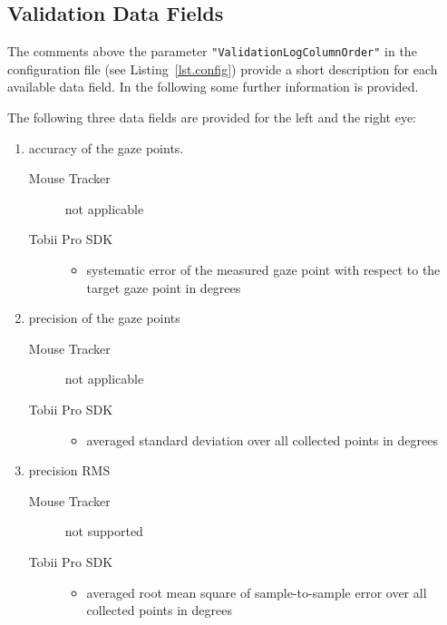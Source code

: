 \documentclass[a4paper,oneside]{book}
\begin{document}
\subsection{Validation Data Fields}
The comments above the parameter \texttt{"ValidationLogColumnOrder"} in the configuration file (see Listing~\ref{lst.config}) provide a short description for each available data field.
In the following some further information is provided.

The following three data fields are provided for the left and the right eye:
\begin{enumerate}
    \item accuracy of the gaze points.
        \begin{description}
            \item[Mouse Tracker] not applicable
            \item[Tobii Pro SDK] \hfill
                \begin{itemize}
                    \item systematic error of the measured gaze point with respect to the target gaze point in degrees
                \end{itemize}
        \end{description}
    \item precision of the gaze points
        \begin{description}
            \item[Mouse Tracker] not applicable
            \item[Tobii Pro SDK] \hfill
                \begin{itemize}
                    \item averaged standard deviation over all collected points in degrees
                \end{itemize}
        \end{description}
    \item precision RMS
        \begin{description}
            \item[Mouse Tracker] not supported
            \item[Tobii Pro SDK] \hfill
                \begin{itemize}
                    \item averaged root mean square of sample-to-sample error over all collected points in degrees
                \end{itemize}
        \end{description}
\end{enumerate}
\end{document}
